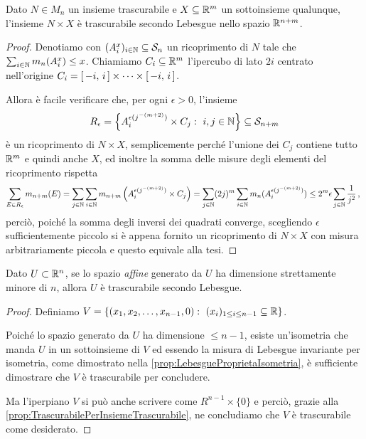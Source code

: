 \begin{proposition}\label{prop:TrascurabilePerInsiemeTrascurabile}
	Dato $N\in M_n$ un insieme trascurabile e $X\subseteq \mathbb R^m$ un sottoinsieme qualunque, l'insieme $N\times X$ è trascurabile secondo Lebesgue nello spazio $\mathbb R^{n+m}$.
\end{proposition}
\begin{proof}
	Denotiamo con $(A^{x}_i)_{i\in\mathbb N}\subseteq \mathcal S_n$ un ricoprimento di $N$ tale che $\sum_{i\in\mathbb N}m_n(A^x_i)\le x$.
	Chiamiamo $C_i\subseteq\mathbb R^m$ l'ipercubo di lato $2i$ centrato nell'origine $C_i=\left[\,-i,\,i\,\right]\times\cdots\times\left[\,-i,\,i\,\right]$.
	
	Allora è facile verificare che, per ogni $\epsilon>0$, l'insieme
	\begin{equation*}
		R_\epsilon=\left\{A^{\epsilon(j^{-(m+2)})}_i\times C_j:\ i,j\in\mathbb N\right\}\subseteq \mathcal S_{n+m}
	\end{equation*}
	è un ricoprimento di $N\times X$, semplicemente perché l'unione dei $C_j$ contiene tutto $\mathbb R^m$ e quindi anche $X$, ed inoltre la somma delle misure degli elementi del ricoprimento rispetta
	\begin{equation*}
		\sum_{E\in R_\epsilon}m_{n+m}(E)=\sum_{j\in\mathbb N}\sum_{i\in\mathbb N}m_{n+m}\left(A^{\epsilon(j^{-(m+2)})}_i\times C_j\right)
		=\sum_{j\in\mathbb N}(2j)^m\sum_{i\in\mathbb N}m_n(A^{\epsilon(j^{-(m+2)})}_i)\le 2^m\epsilon\sum_{j\in\mathbb N}\frac1{j^2}\, \text{, }
	\end{equation*}
	perciò, poiché la somma degli inversi dei quadrati converge, scegliendo $\epsilon$ sufficientemente piccolo si è appena fornito un ricoprimento di $N\times X$ con misura arbitrariamente piccola e questo equivale alla tesi.
\end{proof}


\begin{proposition}\label{prop:SottospaziTrascurabili}
	Dato $U\subset\mathbb R^n$, se lo spazio \emph{affine} generato da $U$ ha dimensione strettamente minore di $n$, allora $U$ è trascurabile secondo Lebesgue.
\end{proposition}
\begin{proof}
	Definiamo $V=\{(x_1,x_2,\dots,x_{n-1},0):\ (x_i)_{1\le i\le n-1}\subseteq\mathbb R\}$.
	
	Poiché lo spazio generato da $U$ ha dimensione $\le n-1$, esiste un'isometria che manda $U$ in un sottoinsieme di $V$ ed essendo la misura di Lebesgue invariante per isometria, come dimostrato nella \cref{prop:LebesgueProprietaIsometria}, è sufficiente dimostrare che $V$ è trascurabile per concludere.
	
	Ma l'iperpiano $V$ si può anche scrivere come $R^{n-1}\times \{0\}$ e perciò, grazie alla \cref{prop:TrascurabilePerInsiemeTrascurabile}, ne concludiamo che $V$ è trascurabile come desiderato.
\end{proof}

